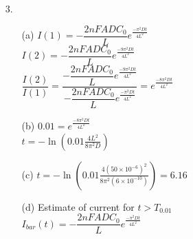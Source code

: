 \documentclass{article}
\begin{document}
\begin{enumerate}
\newpage

\item[3.]
	\begin{enumerate}
	\item[(a)] 
		        $I(1) = -\dfrac{2nFADC_0}{L} e^{\frac{-\pi^2Dt}{4L^2}}$ \\
		        
		        $I(2) = -\dfrac{2nFADC_0}{L} e^{\frac{-9\pi^2Dt}{4L^2}}$ \\
		        \newline\newline
		        $\dfrac{I(2)}{I(1)} = \dfrac{-\dfrac{2nFADC_0}{L} e^{\frac{-9\pi^2Dt}{4L^2}}}{-\dfrac{2nFADC_0}{L} e^{\frac{-\pi^2Dt}{4L^2}}} = e^{\frac{-8\pi^2Dt}{4L^2}}$ \\
\bigskip
	\item[(b)] 
		        $0.01 = e^{\frac{-8\pi^2Dt}{4L^2}}$ \\
		        
		        $t = - \ln{\left(0.01 \frac{4L^2}{8 \pi^2 D}\right)}$
\bigskip
	\item[(c)] 
		        $t = - \ln{\left(0.01 \frac{4(50 \times 10^{-6})^2}{8 \pi^2 (6 \times 10^{-10})}\right)} = 6.16$
\bigskip
	\item[(d)] Estimate of current for $t > T_{0.01}$\\
		        
		        $I_{bar}(t) = -\dfrac{2nFADC_0}{L} e^{\frac{-\pi^2Dt}{4L^2}}$ \\
	\end{enumerate}

\newpage


\end{enumerate}
\end{document}
